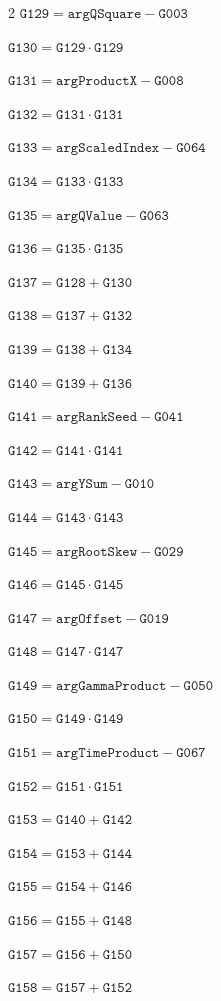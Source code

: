 \documentclass[10pt]{article}
\begin{document}
\begin{multicols}{2}
\noindent $\mathtt{G129}=\mathtt{argQSquare}-\mathtt{G003}$\par
\noindent $\mathtt{G130}=\mathtt{G129}\cdot \mathtt{G129}$\par
\noindent $\mathtt{G131}=\mathtt{argProductX}-\mathtt{G008}$\par
\noindent $\mathtt{G132}=\mathtt{G131}\cdot \mathtt{G131}$\par
\noindent $\mathtt{G133}=\mathtt{argScaledIndex}-\mathtt{G064}$\par
\noindent $\mathtt{G134}=\mathtt{G133}\cdot \mathtt{G133}$\par
\noindent $\mathtt{G135}=\mathtt{argQValue}-\mathtt{G063}$\par
\noindent $\mathtt{G136}=\mathtt{G135}\cdot \mathtt{G135}$\par
\noindent $\mathtt{G137}=\mathtt{G128}+\mathtt{G130}$\par
\noindent $\mathtt{G138}=\mathtt{G137}+\mathtt{G132}$\par
\noindent $\mathtt{G139}=\mathtt{G138}+\mathtt{G134}$\par
\noindent $\mathtt{G140}=\mathtt{G139}+\mathtt{G136}$\par
\noindent $\mathtt{G141}=\mathtt{argRankSeed}-\mathtt{G041}$\par
\noindent $\mathtt{G142}=\mathtt{G141}\cdot \mathtt{G141}$\par
\noindent $\mathtt{G143}=\mathtt{argYSum}-\mathtt{G010}$\par
\noindent $\mathtt{G144}=\mathtt{G143}\cdot \mathtt{G143}$\par
\noindent $\mathtt{G145}=\mathtt{argRootSkew}-\mathtt{G029}$\par
\noindent $\mathtt{G146}=\mathtt{G145}\cdot \mathtt{G145}$\par
\noindent $\mathtt{G147}=\mathtt{argOffset}-\mathtt{G019}$\par
\noindent $\mathtt{G148}=\mathtt{G147}\cdot \mathtt{G147}$\par
\noindent $\mathtt{G149}=\mathtt{argGammaProduct}-\mathtt{G050}$\par
\noindent $\mathtt{G150}=\mathtt{G149}\cdot \mathtt{G149}$\par
\noindent $\mathtt{G151}=\mathtt{argTimeProduct}-\mathtt{G067}$\par
\noindent $\mathtt{G152}=\mathtt{G151}\cdot \mathtt{G151}$\par
\noindent $\mathtt{G153}=\mathtt{G140}+\mathtt{G142}$\par
\noindent $\mathtt{G154}=\mathtt{G153}+\mathtt{G144}$\par
\noindent $\mathtt{G155}=\mathtt{G154}+\mathtt{G146}$\par
\noindent $\mathtt{G156}=\mathtt{G155}+\mathtt{G148}$\par
\noindent $\mathtt{G157}=\mathtt{G156}+\mathtt{G150}$\par
\noindent $\mathtt{G158}=\mathtt{G157}+\mathtt{G152}$\par
\end{multicols}
\end{document}
